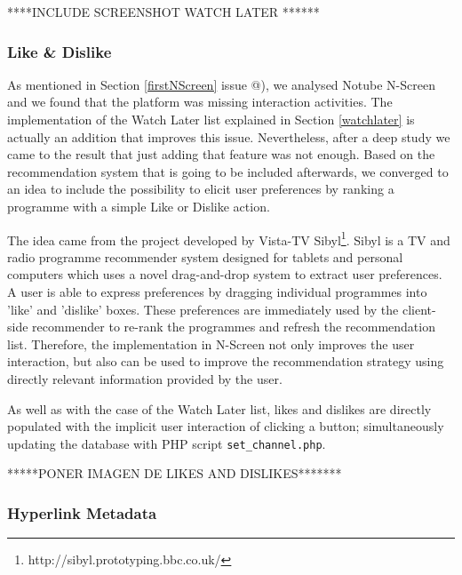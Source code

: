 \documentclass{acm_proc_article-sp}
\makeatletter
\newcommand*{\rom}[1]{\expandafter\@slowromancap\romannumeral #1@}
\makeatother
\begin{document}
****INCLUDE SCREENSHOT WATCH LATER ******

\subsubsection{Like \& Dislike}
As mentioned in Section \ref{firstNScreen} issue \rom{3}), we analysed Notube N-Screen and we found that the platform was missing interaction activities. The implementation of the Watch Later list explained in Section \ref{watchlater} is  actually an addition that improves this issue. Nevertheless, after a deep study we came to the result that just adding that feature was not enough. Based on the recommendation system that is going to be included afterwards, we converged to an idea to include the possibility to elicit user preferences by ranking a programme with a simple Like or Dislike action. 

The idea came from the project developed by Vista-TV Sibyl\footnote{http://sibyl.prototyping.bbc.co.uk/}. Sibyl is a TV and radio programme recommender system designed for tablets and personal computers which uses a novel drag-and-drop system to extract user preferences. A user is able to express preferences by dragging individual programmes into 'like' and 'dislike' boxes. These preferences are immediately used by the client-side recommender to re-rank the programmes and refresh the recommendation list. Therefore, the implementation in N-Screen not only improves the user interaction, but also can be used to improve the recommendation strategy using directly relevant information provided by the user. 

As well as with the case of the Watch Later list, likes and dislikes are directly populated with the implicit user interaction of clicking a button; simultaneously updating the database with PHP script \texttt{set\_channel.php}. 

*****PONER IMAGEN DE LIKES AND DISLIKES*******

\subsubsection{Hyperlink Metadata}
\end{document}
